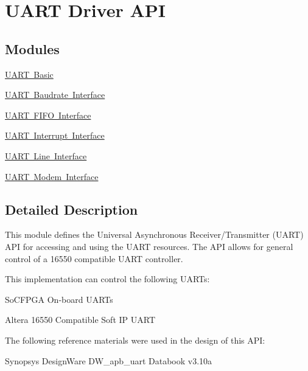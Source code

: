 \hypertarget{group__UART}{}\section{U\+A\+RT Driver A\+PI}
\label{group__UART}
\subsection*{Modules}
\begin{DoxyCompactItemize}
\item 
\mbox{\hyperlink{group__UART__BASIC}{U\+A\+R\+T Basic}}
\item 
\mbox{\hyperlink{group__UART__BAUD}{U\+A\+R\+T Baudrate Interface}}
\item 
\mbox{\hyperlink{group__UART__FIFO}{U\+A\+R\+T F\+I\+F\+O Interface}}
\item 
\mbox{\hyperlink{group__UART__INT}{U\+A\+R\+T Interrupt Interface}}
\item 
\mbox{\hyperlink{group__UART__LINE}{U\+A\+R\+T Line Interface}}
\item 
\mbox{\hyperlink{group__UART__MODEM}{U\+A\+R\+T Modem Interface}}
\end{DoxyCompactItemize}


\subsection{Detailed Description}
This module defines the Universal Asynchronous Receiver/\+Transmitter (U\+A\+RT) A\+PI for accessing and using the U\+A\+RT resources. The A\+PI allows for general control of a 16550 compatible U\+A\+RT controller.

This implementation can control the following U\+A\+R\+Ts\+:
\begin{DoxyItemize}
\item So\+C\+F\+P\+GA On-\/board U\+A\+R\+Ts
\item Altera 16550 Compatible Soft IP U\+A\+RT
\end{DoxyItemize}

The following reference materials were used in the design of this A\+PI\+:
\begin{DoxyItemize}
\item Synopsys\textregistered{} Design\+Ware D\+W\+\_\+apb\+\_\+uart Databook v3.\+10a 
\end{DoxyItemize}